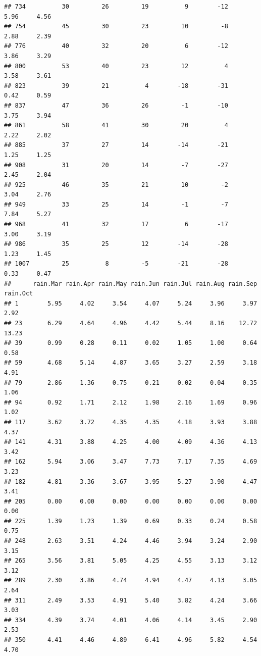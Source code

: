 \documentclass[
]{article}
\begin{document}
\begin{verbatim}
## 734          30         26         19          9        -12     5.96     4.56
## 754          45         30         23         10         -8     2.88     2.39
## 776          40         32         20          6        -12     3.86     3.29
## 800          53         40         23         12          4     3.58     3.61
## 823          39         21          4        -18        -31     0.42     0.59
## 837          47         36         26         -1        -10     3.75     3.94
## 861          58         41         30         20          4     2.22     2.02
## 885          37         27         14        -14        -21     1.25     1.25
## 908          31         20         14         -7        -27     2.45     2.04
## 925          46         35         21         10         -2     3.04     2.76
## 949          33         25         14         -1         -7     7.84     5.27
## 968          41         32         17          6        -17     3.00     3.19
## 986          35         25         12        -14        -28     1.23     1.45
## 1007         25          8         -5        -21        -28     0.33     0.47
##      rain.Mar rain.Apr rain.May rain.Jun rain.Jul rain.Aug rain.Sep rain.Oct
## 1        5.95     4.02     3.54     4.07     5.24     3.96     3.97     2.92
## 23       6.29     4.64     4.96     4.42     5.44     8.16    12.72    13.23
## 39       0.99     0.28     0.11     0.02     1.05     1.00     0.64     0.58
## 59       4.68     5.14     4.87     3.65     3.27     2.59     3.18     4.91
## 79       2.86     1.36     0.75     0.21     0.02     0.04     0.35     1.06
## 94       0.92     1.71     2.12     1.98     2.16     1.69     0.96     1.02
## 117      3.62     3.72     4.35     4.35     4.18     3.93     3.88     4.37
## 141      4.31     3.88     4.25     4.00     4.09     4.36     4.13     3.42
## 162      5.94     3.06     3.47     7.73     7.17     7.35     4.69     3.23
## 182      4.81     3.36     3.67     3.95     5.27     3.90     4.47     3.41
## 205      0.00     0.00     0.00     0.00     0.00     0.00     0.00     0.00
## 225      1.39     1.23     1.39     0.69     0.33     0.24     0.58     0.75
## 248      2.63     3.51     4.24     4.46     3.94     3.24     2.90     3.15
## 265      3.56     3.81     5.05     4.25     4.55     3.13     3.12     3.12
## 289      2.30     3.86     4.74     4.94     4.47     4.13     3.05     2.64
## 311      2.49     3.53     4.91     5.40     3.82     4.24     3.66     3.03
## 334      4.39     3.74     4.01     4.06     4.14     3.45     2.90     2.53
## 350      4.41     4.46     4.89     6.41     4.96     5.82     4.54     4.70

\end{verbatim}
\end{document}
